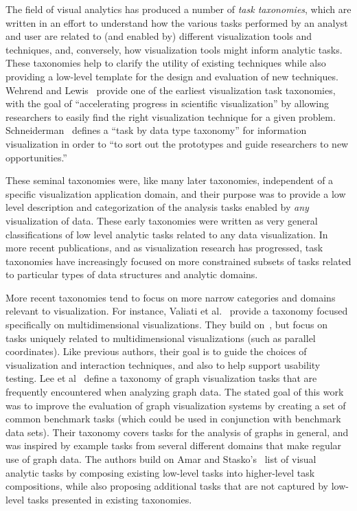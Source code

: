 \documentclass[twocolumn]{bmcart}%
\begin{document}
The field of visual analytics has produced a number of \emph{task taxonomies}, which are written in an effort to understand how the various tasks performed by an analyst and user are related to (and enabled by) different visualization tools and techniques, and, conversely, how visualization tools might inform analytic tasks.
These taxonomies help to clarify the utility of existing techniques while also providing a low-level template for the design and evaluation of new techniques.
Wehrend and Lewis~\cite{Wehrend1990} provide one of the earliest visualization task taxonomies, with the goal of ``accelerating progress in scientific visualization'' by allowing researchers to easily find the right visualization technique for a given problem.
Schneiderman~\cite{Shneiderman1996} defines a ``task by data type taxonomy'' for information visualization in order to ``to sort out the prototypes and guide researchers to new opportunities.''

These seminal taxonomies were, like many later taxonomies, independent of a specific visualization application domain, and their purpose was to provide a low level description and categorization of the analysis tasks enabled by \textit{any} visualization of data.
These early taxonomies were written as very general classifications of low level analytic tasks related to any data visualization.
In more recent publications, and as visualization research has progressed, task taxonomies have increasingly focused on more constrained subsets of tasks related to particular types of data structures and analytic domains.

More recent taxonomies tend to focus on more narrow categories and domains relevant to visualization.
For instance, Valiati et al.~\cite{Valiati2006} provide a taxonomy focused specifically on multidimensional visualizations.
They build on~\cite{Wehrend1990}, but focus on tasks uniquely related to multidimensional visualizations (such as parallel coordinates).
Like previous authors, their goal is to guide the choices of visualization and interaction techniques, and also to help support usability testing.
Lee et al~\cite{Lee2006} define a taxonomy of graph visualization tasks that are frequently encountered when analyzing graph data.
The stated goal of this work was to improve the evaluation of graph visualization systems by creating a set of common benchmark tasks (which could be used in conjunction with benchmark data sets).
Their taxonomy covers tasks for the analysis of graphs in general, and was inspired by example tasks from several different domains that make regular use of graph data.
The authors build on Amar and Stasko's~\cite{Amar2005} list of visual analytic tasks by composing existing low-level tasks into higher-level task compositions, while also proposing additional tasks that are not captured by low-level tasks presented in existing taxonomies.
\end{document}
